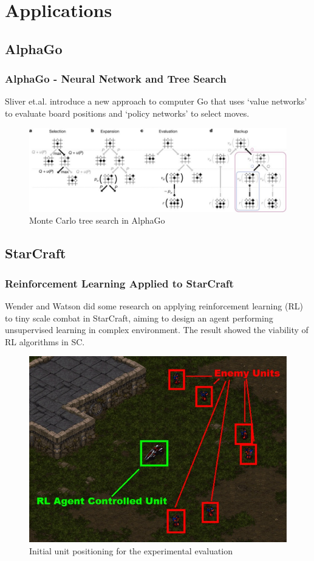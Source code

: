 \documentclass{beamer}
\begin{document}
\section{Applications}
\subsection{AlphaGo}
\begin{frame}
  \frametitle{AlphaGo - Neural Network and Tree Search}
  Sliver et.al. \cite{11} introduce a new approach to computer Go that uses ‘value networks’ to evaluate board positions and ‘policy networks’ to select moves.
  \begin{figure}
    \includegraphics[width=1\linewidth]{figure/gosearch}
    \caption{ Monte Carlo tree search in AlphaGo}
  \end{figure}
\end{frame}

\subsection{StarCraft}
\begin{frame}
  \frametitle{Reinforcement Learning Applied to StarCraft}
  Wender and Watson did some research \cite{12} on applying reinforcement learning (RL) to tiny scale combat in StarCraft, aiming to design an agent performing unsupervised learning in complex environment. The result showed the viability of RL algorithms in SC.
  \begin{figure}
    \includegraphics[width=0.6\linewidth]{figure/sc}
    \caption{ Initial unit positioning for the experimental evaluation}
  \end{figure}
\end{frame}
\end{document}
